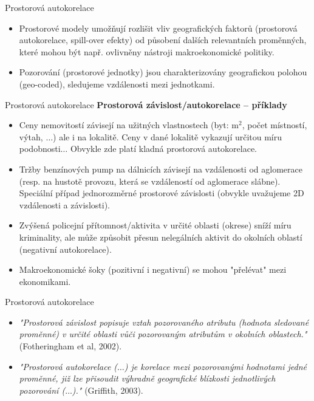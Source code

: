 \documentclass{beamer}
\begin{document}
\begin{frame}{Prostorová autokorelace}
\begin{itemize}
\item Prostorové modely umožňují rozlišit vliv geografických faktorů (prostorová autokorelace, spill-over efekty) od působení dalších relevantních proměnných, které mohou být např. ovlivněny nástroji makroekonomické politiky.
\item Pozorování (prostorové jednotky) jsou charakterizovány geografickou polohou (geo-coded), sledujeme vzdálenosti mezi jednotkami.
\end{itemize}
\end{frame}
\begin{frame}{Prostorová autokorelace}
\textbf{Prostorová závislost/autokorelace – příklady}
\begin{itemize}
	\item Ceny nemovitostí závisejí na užitných vlastnostech (byt: m$^2$, počet místností, výtah, $\dots$) ale i na lokalitě. Ceny v dané lokalitě vykazují určitou míru podobnosti$\dots$ Obvykle zde platí kladná prostorová autokorelace. 
	\item Tržby benzínových pump na dálnicích závisejí na vzdálenosti od aglomerace (resp. na hustotě provozu, která se vzdáleností od aglomerace slábne). Speciální případ jednorozměrné prostorové závislosti (obvykle uvažujeme 2D vzdálenosti a závislosti).
	\item Zvýšená policejní přítomnost/aktivita v určité oblasti (okrese) sníží míru kriminality, ale může způsobit přesun nelegálních aktivit do okolních oblastí (negativní autokorelace).
	\item Makroekonomické šoky (pozitivní i negativní) se mohou "přelévat" mezi ekonomikami. 
\end{itemize}
\end{frame}
\begin{frame}{Prostorová autokorelace}
\begin{itemize}
	\item \textit{"Prostorová závislost popisuje vztah pozorovaného atributu (hodnota sledované proměnné) v určité oblasti vůči pozorovaným atributům v okolních oblastech."} (Fotheringham et al, 2002).
	
	\item \textit{"Prostorová autokorelace ($\dots$) je korelace mezi pozorovanými hodnotami jedné proměnné, již lze přisoudit výhradně geografické blízkosti jednotlivých pozorování ($\dots$)."} (Griffith, 2003).
\end{itemize}
\end{frame}
\end{document}
